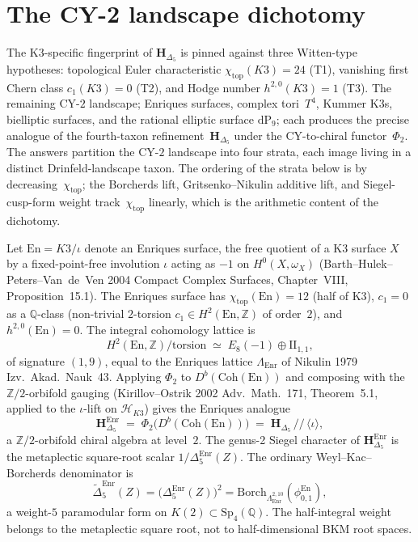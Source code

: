 \section{The CY-2 landscape dichotomy}
\label{sec:dcy-psi-landscape-routes}

The K3-specific fingerprint of $\mathbf{H}_{\Delta_5}$ is pinned
against three Witten-type hypotheses: topological Euler
characteristic $\chi_{\mathrm{top}}(K3) = 24$ (T1), vanishing
first Chern class $c_1(K3) = 0$ (T2), and Hodge number
$h^{2,0}(K3) = 1$ (T3). The remaining CY-$2$
landscape; Enriques surfaces, complex tori~$T^4$, Kummer K3s,
bielliptic surfaces, and the rational elliptic surface
$\mathrm{dP}_9$; each produces the precise analogue of
the fourth-taxon refinement~$\mathbf{H}_{\Delta_5}$ under the
CY-to-chiral functor~$\Phi_2$. The answers partition the CY-$2$
landscape into four strata, each image living in a distinct
Drinfeld-landscape taxon. The ordering of the strata below is by
decreasing~$\chi_{\mathrm{top}}$; the Borcherds lift,
Gritsenko--Nikulin additive lift, and Siegel-cusp-form weight
track~$\chi_{\mathrm{top}}$ linearly, which is the arithmetic
content of the dichotomy.

\begin{theorem}
\label{thm:dcy-enriques-analogue}
Let $\mathrm{En} = K3/\iota$ denote an Enriques surface, the free
quotient of a K3 surface $X$ by a fixed-point-free involution
$\iota$ acting as $-1$ on $H^0(X, \omega_X)$
(Barth--Hulek--Peters--Van~de~Ven 2004
\textup{Compact Complex Surfaces}, Chapter~VIII, Proposition~15.1).
The Enriques surface has $\chi_{\mathrm{top}}(\mathrm{En}) = 12$
(half of K3), $c_1 = 0$ as a $\mathbb{Q}$-class (non-trivial
$2$-torsion $c_1 \in H^2(\mathrm{En},\mathbb{Z})$ of order~$2$),
and $h^{2,0}(\mathrm{En}) = 0$. The integral cohomology lattice is
\[
 H^2(\mathrm{En},\mathbb{Z})/\mathrm{torsion} \;\simeq\; E_8(-1) \oplus \mathrm{II}_{1,1},
\]
of signature $(1,9)$, equal to the Enriques lattice
$\Lambda_{\mathrm{Enr}}$ of Nikulin 1979
\textup{Izv.~Akad.~Nauk}~43. Applying $\Phi_2$ to
$D^b(\mathrm{Coh}(\mathrm{En}))$ and composing with the
$\mathbb{Z}/2$-orbifold gauging (Kirillov--Ostrik 2002
\textup{Adv.~Math.}~171, Theorem~5.1, applied to the $\iota$-lift
on $\mathcal{H}_{K3}$) gives the Enriques analogue
\[
 \mathbf{H}_{\Delta_5}^{\mathrm{Enr}}
 \;=\;
 \Phi_2\bigl(D^b(\mathrm{Coh}(\mathrm{En}))\bigr)
 \;=\;
 \mathbf{H}_{\Delta_5}\,/\!\!/\,\langle\iota\rangle,
\]
a $\mathbb{Z}/2$-orbifold chiral algebra at level~$2$. The genus-2
Siegel character of $\mathbf{H}_{\Delta_5}^{\mathrm{Enr}}$ is
the metaplectic square-root scalar \(1/\Delta_5^{\mathrm{Enr}}(Z)\).
The ordinary Weyl--Kac--Borcherds denominator is
\[
 \widetilde\Delta_5^{\mathrm{Enr}}(Z)
 =
 \bigl(\Delta_5^{\mathrm{Enr}}(Z)\bigr)^2
 =
 \mathrm{Borch}_{\Lambda^{2,10}_{\mathrm{Enr}}}
 (\phi^{\mathrm{En}}_{0,1}),
\]
a weight-$5$ paramodular form on
\(K(2)\subset\mathrm{Sp}_4(\mathbb{Q})\). The half-integral weight
belongs to the metaplectic square root, not to half-dimensional BKM
root spaces.
\end{theorem}

